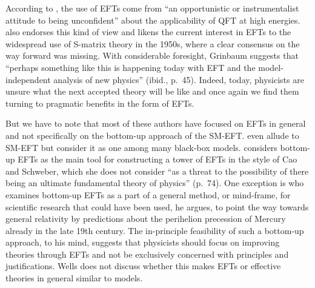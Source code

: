 According to \citet{Butterfield_2010}, the use of EFTs come from ``an opportunistic or instrumentalist attitude to being unconfident'' about the applicability of QFT at high energies.
\citet{Grinbaum2008-GRIOTE} also endorses this kind of view and likens the current interest in EFTs to the widespread use of S-matrix theory in the 1950s, where a clear consensus on the way forward was missing. 
With considerable foresight, Grinbaum suggests that ``perhaps something like this is happening today with EFT and the model-independent analysis of new physics'' (ibid., p.~45).
Indeed, today, physicists are unsure what the next accepted theory will be like and once again we find them turning to pragmatic benefits in the form of EFTs.

But we have to note that most of these authors have focused on EFTs in general and not specifically on the bottom-up approach of the SM-EFT.
\citet[p.~3]{Rivat2020-RIVPFO} even allude to SM-EFT but consider it as one among many black-box models. 
\citet[p.~72]{Crowther2016-CROESU} considers bottom-up EFTs as the main tool for constructing a tower of EFTs in the style of Cao and Schweber, which she does not consider ``as a threat to the possibility of there being an ultimate fundamental theory of physics'' (p.~74).  
One exception is \citet{wells2011} who examines bottom-up EFTs as a part of a general method, or mind-frame, for scientific research that could have been used, he argues, to point the way towards general relativity by predictions about the perihelion precession of Mercury already in the late 19th century. 
The in-principle feasibility of such a bottom-up approach, to his mind, suggests that physicists should focus on improving theories through EFTs and not be exclusively concerned with principles and justifications.
Wells does not discuss whether this makes EFTs or effective theories in general similar to models.


